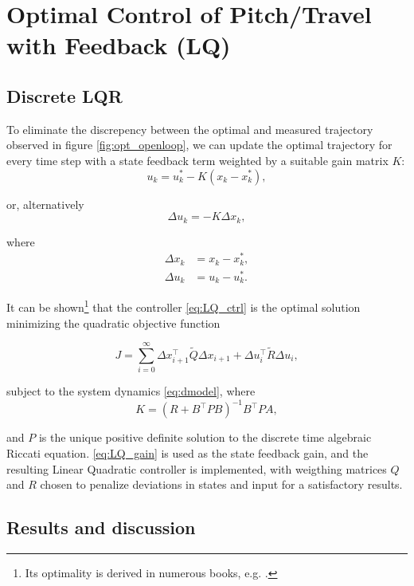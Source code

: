 \section{Optimal Control of Pitch/Travel with Feedback (LQ)}\label{sec:prob3}
\label{text:problem3}

\subsection{Discrete LQR}
\label{text:LQR}

To eliminate the discrepency between the optimal and measured trajectory observed in figure \ref{fig:opt_openloop}, we can update the optimal trajectory for every time step with a state feedback term weighted by a suitable gain matrix $K$:
\begin{equation*}
u_k = u_k^* - K (x_k - x_k^*),
\end{equation*}

or, alternatively
\begin{equation}
\label{eq:LQ_ctrl}
\Delta u_k = - K \Delta x_k,
\end{equation}

where 
\begin{align*}
\Delta x_k &= x_k - x_k^*,\\
\Delta u_k &= u_k - u_k^*.
\end{align*}

It can be shown\footnote{Its optimality is derived in numerous books, e.g. \cite{Kwakernaak1972}.} that the controller \eqref{eq:LQ_ctrl} is the optimal solution minimizing the quadratic objective function

\begin{equation*}
	J = \sum_{i=0}^{\infty} \Delta x_{i+1}^\top \tilde{Q} \Delta x_{i+1} + \Delta u_i^\top \tilde{R} \Delta u_i,
\end{equation*}

subject to the system dynamics \eqref{eq:dmodel}, where
\begin{equation}
\label{eq:LQ_gain}
	K = (R + B^\top P B)^{-1} B^\top P A,
\end{equation}

and $P$ is the unique positive definite solution to the discrete time algebraic Riccati equation. \eqref{eq:LQ_gain} is used as the state feedback gain, and the resulting Linear Quadratic controller is implemented, with weigthing matrices $Q$ and $R$ chosen to penalize deviations in states and input for a satisfactory results.

\subsection{Results and discussion}

